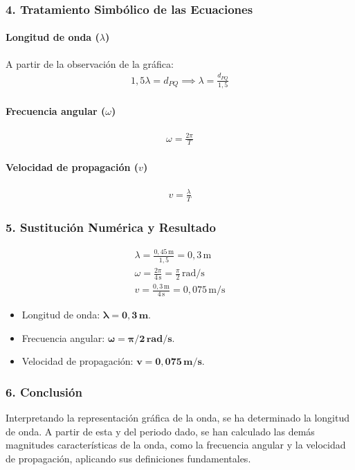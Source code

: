 \subsubsection*{4. Tratamiento Simbólico de las Ecuaciones}
\paragraph{Longitud de onda ($\lambda$)}
A partir de la observación de la gráfica:
\begin{gather}
    1,5 \lambda = d_{PQ} \implies \lambda = \frac{d_{PQ}}{1,5}
\end{gather}
\paragraph{Frecuencia angular ($\omega$)}
\begin{gather}
    \omega = \frac{2\pi}{T}
\end{gather}
\paragraph{Velocidad de propagación ($v$)}
\begin{gather}
    v = \frac{\lambda}{T}
\end{gather}
\subsubsection*{5. Sustitución Numérica y Resultado}
\begin{gather}
    \lambda = \frac{0,45\,\text{m}}{1,5} = 0,3\,\text{m} \\
    \omega = \frac{2\pi}{4\,\text{s}} = \frac{\pi}{2}\,\text{rad/s} \\
    v = \frac{0,3\,\text{m}}{4\,\text{s}} = 0,075\,\text{m/s}
\end{gather}
\begin{cajaresultado}
\begin{itemize}
    \item Longitud de onda: $\boldsymbol{\lambda = 0,3\,\textbf{m}}$.
    \item Frecuencia angular: $\boldsymbol{\omega = \pi/2\,\textbf{rad/s}}$.
    \item Velocidad de propagación: $\boldsymbol{v = 0,075\,\textbf{m/s}}$.
\end{itemize}
\end{cajaresultado}
\subsubsection*{6. Conclusión}
\begin{cajaconclusion}
Interpretando la representación gráfica de la onda, se ha determinado la longitud de onda. A partir de esta y del periodo dado, se han calculado las demás magnitudes características de la onda, como la frecuencia angular y la velocidad de propagación, aplicando sus definiciones fundamentales.
\end{cajaconclusion}
\newpage

